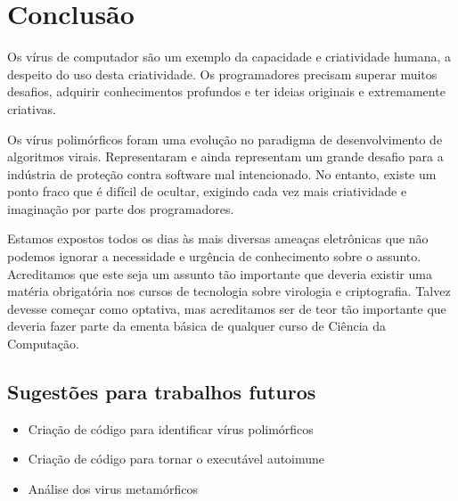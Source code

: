 \chapter{Conclusão}

Os vírus de computador são um exemplo da capacidade e criatividade humana, a despeito do uso desta criatividade. Os programadores precisam superar muitos desafios, adquirir conhecimentos profundos e ter ideias originais e extremamente criativas.

Os vírus polimórficos foram uma evolução no paradigma de desenvolvimento de algoritmos virais. Representaram e ainda representam um grande desafio para a indústria de proteção contra software mal intencionado. No entanto, existe um ponto fraco que é difícil de ocultar, exigindo cada vez mais criatividade e imaginação por parte dos programadores.

Estamos expostos todos os dias às mais diversas ameaças eletrônicas que não podemos ignorar a necessidade e urgência de conhecimento sobre o assunto. Acreditamos que este seja um assunto tão importante que deveria existir uma matéria obrigatória nos cursos de tecnologia sobre virologia e criptografia. Talvez devesse começar como optativa, mas acreditamos ser de teor tão importante que deveria fazer parte da ementa básica de qualquer curso de Ciência da Computação.

\section{Sugestões para trabalhos futuros}
\begin{itemize}
\item Criação de código para identificar vírus polimórficos
\item Criação de código para tornar o executável autoimune
\item Análise dos virus metamórficos
\end{itemize}
